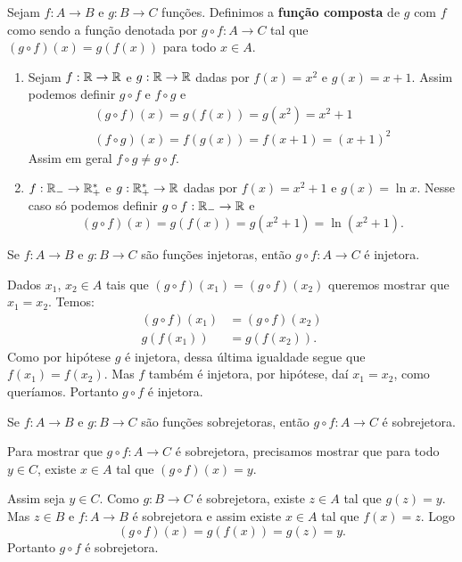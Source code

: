 \begin{definicao}
	Sejam $f : A \to B$ e $g : B \to C$ funções. Definimos a \textbf{função composta} de $g$ com $f$ como sendo a função denotada por $g \circ f : A \to C$ tal que $(g\circ f)(x) = g(f(x))$ para todo $x \in A$.
\end{definicao}

\begin{exemplos}
	\begin{enumerate}[label={\arabic*})]
		\item Sejam $f : \mathbb{R} \to \mathbb{R}$ e $g : \mathbb{R} \to \mathbb{R}$ dadas por $f(x) = x^2$ e $g(x) = x + 1$. Assim podemos definir $g \circ f$ e $f \circ g$ e
		\begin{align*}
			(g\circ f)(x) = g(f(x)) = g(x^2) = x^2 + 1\\
			(f\circ g)(x) = f(g(x)) = f(x + 1) = (x + 1)^2
		\end{align*}
		Assim em geral $f \circ g \ne g \circ f$.

		\item $f : \mathbb{R}_- \to \mathbb{R}^*_+$ e $g : \mathbb{R}^*_+ \to \mathbb{R}$ dadas por $f(x) = x^2 + 1$ e $g(x) = \ln x$. Nesse caso só podemos definir $g \circ f : \mathbb{R}_- \to \mathbb{R}$ e
		\[
			(g\circ f)(x) = g(f(x)) = g(x^2 + 1) = \ln(x^2 + 1).
		\]
	\end{enumerate}
\end{exemplos}

\begin{proposicao}
	Se $f : A \to B$ e $g : B \to C$ s{\~a}o fun{\c c}{\~o}es injetoras, ent{\~a}o $g\circ f : A \to C$ {\'e} injetora.
\end{proposicao}
\begin{prova}
	Dados $x_{1}$, $x_{2} \in A$ tais que $(g\circ f)(x_{1}) = (g\circ f)(x_{2})$ queremos mostrar que $x_1 = x_2$. Temos:
	\begin{align*}
		(g\circ f)(x_{1}) &= (g\circ f)(x_{2})\\
		g(f(x_1)) &= g(f(x_2)).
	\end{align*}
	Como por hipótese $g$ é injetora, dessa última igualdade segue que $f(x_1) = f(x_2)$. Mas $f$ também é injetora, por hipótese, daí $x_1 = x_2$, como queríamos. Portanto $g\circ f$ é injetora.
\end{prova}

\begin{proposicao}
	Se $f : A \to B$ e $g : B \to C$ s{\~a}o funções sobrejetoras, ent{\~a}o $g\circ f : A \to C$ {\'e} sobrejetora.
\end{proposicao}
\begin{prova}
 	Para mostrar que $g \circ f : A \to C$ é sobrejetora, precisamos mostrar que para todo $y \in C$, existe $x \in A$ tal que $(g\circ f)(x) = y$.

 	Assim seja $y \in C$. Como $g : B \to C$ é sobrejetora, existe $z \in A$ tal que $g(z) = y$. Mas $z \in B$ e $f : A \to B$ é sobrejetora e assim existe $x \in A$ tal que $f(x) = z$. Logo
 	\[
 		(g\circ f)(x) = g(f(x)) = g(z) = y.
 	\]
 	Portanto $g \circ f$ é sobrejetora.
\end{prova}

